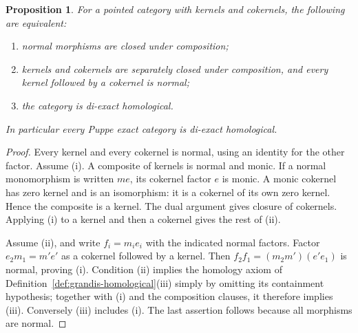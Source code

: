 \documentclass[11pt,reqno,a4paper]{amsart}
\newtheorem{proposition}[theorem]{Proposition}
\theoremstyle{definition}
\theoremstyle{remark}
\newcommand{\0}{\mathbf{0}}
\renewcommand{\1}{\mathbf{1}}
\begin{document}
\begin{proposition}\label{prop:diexact-equivalences}
For a pointed category with kernels and cokernels, the following are
equivalent:
\begin{enumerate}[label=\textup{(\roman*)}]
\item normal morphisms are closed under composition;
\item kernels and cokernels are separately closed under composition,
and every kernel followed by a cokernel is normal;
\item the category is di-exact homological.
\end{enumerate}
In particular every Puppe exact category is di-exact homological.
\end{proposition}
\begin{proof}
Every kernel and every cokernel is normal, using an identity for the
other factor. Assume (i). A composite of kernels is normal and monic.
If a normal monomorphism is written $me$, its cokernel factor $e$ is
monic. A monic cokernel has zero kernel and is an isomorphism: it is
a cokernel of its own zero kernel. Hence the composite is a kernel.
The dual argument gives closure of cokernels. Applying (i) to a kernel
and then a cokernel gives the rest of (ii).

Assume (ii), and write $f_i=m_ie_i$ with the indicated normal factors.
Factor $e_2m_1=m'e'$ as a cokernel followed by a kernel. Then
$f_2f_1=(m_2m')(e'e_1)$ is normal, proving (i). Condition (ii) implies the homology axiom of
Definition~\ref{def:grandis-homological}\textup{(iii)} simply by
omitting its containment hypothesis; together with (i) and the
composition clauses, it therefore implies (iii).
Conversely (iii) includes (i).
The last assertion follows because all morphisms are normal.
\end{proof}
\end{document}
